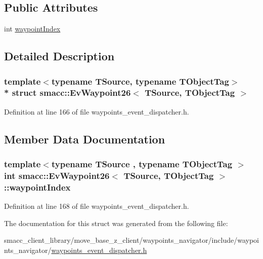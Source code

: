 \subsection*{Public Attributes}
\begin{DoxyCompactItemize}
\item 
int \hyperlink{structsmacc_1_1EvWaypoint26_a6d3c14fb161af9bbeefb6bb74d915018}{waypoint\+Index}
\end{DoxyCompactItemize}


\subsection{Detailed Description}
\subsubsection*{template$<$typename T\+Source, typename T\+Object\+Tag$>$\\*
struct smacc\+::\+Ev\+Waypoint26$<$ T\+Source, T\+Object\+Tag $>$}



Definition at line 166 of file waypoints\+\_\+event\+\_\+dispatcher.\+h.



\subsection{Member Data Documentation}
\subsubsection[{\texorpdfstring{waypoint\+Index}{waypointIndex}}]{\setlength{\rightskip}{0pt plus 5cm}template$<$typename T\+Source , typename T\+Object\+Tag $>$ int {\bf smacc\+::\+Ev\+Waypoint26}$<$ T\+Source, T\+Object\+Tag $>$\+::waypoint\+Index}\hypertarget{structsmacc_1_1EvWaypoint26_a6d3c14fb161af9bbeefb6bb74d915018}{}\label{structsmacc_1_1EvWaypoint26_a6d3c14fb161af9bbeefb6bb74d915018}


Definition at line 168 of file waypoints\+\_\+event\+\_\+dispatcher.\+h.



The documentation for this struct was generated from the following file\+:\begin{DoxyCompactItemize}
\item 
smacc\+\_\+client\+\_\+library/move\+\_\+base\+\_\+z\+\_\+client/waypoints\+\_\+navigator/include/waypoints\+\_\+navigator/\hyperlink{waypoints__event__dispatcher_8h}{waypoints\+\_\+event\+\_\+dispatcher.\+h}\end{DoxyCompactItemize}
